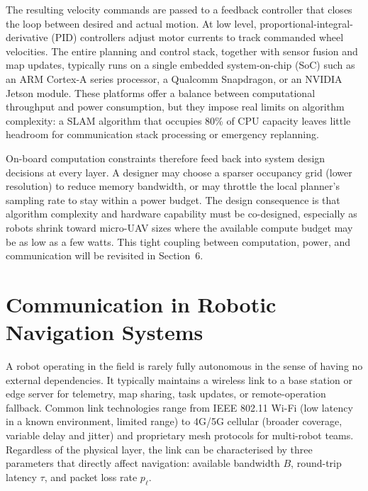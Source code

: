 The resulting velocity commands are passed to a feedback controller that closes the loop
between desired and actual motion.
At low level, proportional-integral-derivative (PID) controllers adjust motor currents
to track commanded wheel velocities.
The entire planning and control stack, together with sensor fusion and map updates,
typically runs on a single embedded system-on-chip (SoC) such as an ARM Cortex-A series
processor, a Qualcomm Snapdragon, or an NVIDIA Jetson module.
These platforms offer a balance between computational throughput and power consumption,
but they impose real limits on algorithm complexity: a SLAM algorithm that occupies
80\% of CPU capacity leaves little headroom for communication stack processing or
emergency replanning.

On-board computation constraints therefore feed back into system design decisions at
every layer.
A designer may choose a sparser occupancy grid (lower resolution) to reduce memory
bandwidth, or may throttle the local planner's sampling rate to stay within a power
budget.
The design consequence is that algorithm complexity and hardware capability must be
co-designed, especially as robots shrink toward micro-UAV sizes where the available
compute budget may be as low as a few watts.
This tight coupling between computation, power, and communication will be revisited in
Section~6.

\section{Communication in Robotic Navigation Systems}

A robot operating in the field is rarely fully autonomous in the sense of having no
external dependencies.
It typically maintains a wireless link to a base station or edge server for telemetry,
map sharing, task updates, or remote-operation fallback.
Common link technologies range from IEEE 802.11 Wi-Fi (low latency in a known
environment, limited range) to 4G/5G cellular (broader coverage, variable delay and
jitter) and proprietary mesh protocols for multi-robot teams.
Regardless of the physical layer, the link can be characterised by three parameters
that directly affect navigation: available bandwidth \(B\), round-trip latency \(\tau\),
and packet loss rate \(p_{\ell}\).


